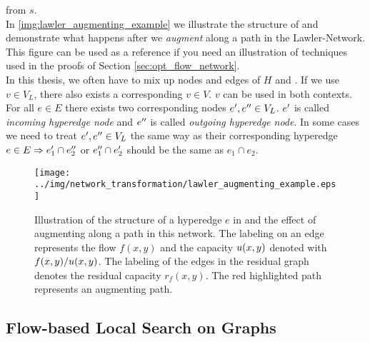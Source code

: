 from $s$. \\ 
In \autoref{img:lawler_augmenting_example} we illustrate the structure of  and demonstrate
what happens after we \emph{augment} along a path in the Lawler-Network. This figure can be used as
a reference if you need an illustration of techniques used in the proofs of Section \ref{sec:opt_flow_network}.\\
In this thesis, we often have to mix up nodes and edges of $H$ and . If we use
$v \in V_L$, there also exists a corresponding $v \in V$. $v$ can be used in both contexts.
For all $e \in E$ there exists two corresponding nodes $e',e'' \in V_L$. $e'$ 
is called \emph{incoming hyperedge node} and $e''$ is called \emph{outgoing hyperedge node}. 
In some cases we need to treat $e',e'' \in V_L$ the same way as their corresponding 
hyperedge $e \in E \Rightarrow e_1' \cap e_2''$ or $e_1'' \cap e_2'$ should be the same as $e_1 \cap e_2$.
\begin{figure}[t!]
\centering
\texttt{[image: ../img/network\_transformation/lawler\_augmenting\_example.eps]}
\caption{Illustration of the structure of a hyperedge $e$ in  and the effect of augmenting
         along a path in this network. The labeling on an edge represents the flow $f(x,y)$ and
         the capacity $u(x,y)$ denoted with $f(x,y)/u(x,y)$. The labeling of the
         edges in the residual graph denotes the residual capacity $r_f(x,y)$. The red highlighted
         path represents an augmenting path.}
\label{img:lawler_augmenting_example}
\end{figure}


\subsection{Flow-based Local Search on Graphs}
\label{sec:flow_local_search_graph}

